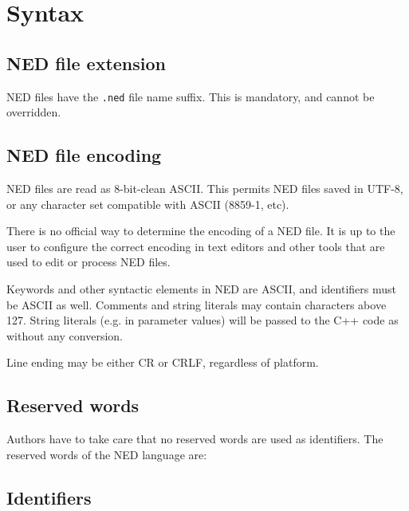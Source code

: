 \label{cha:ned-ref}

\section{Syntax}

\subsection{NED file extension}

NED files have the \texttt{.ned} file name suffix. This is mandatory, and
cannot be overridden.

\subsection{NED file encoding}

NED files are read as 8-bit-clean ASCII. This permits NED files saved
in UTF-8, or any character set compatible with ASCII (8859-1, etc).

\begin{note}
    There is no official way to determine the encoding of a NED file. It is up
    to the user to configure the correct encoding in text editors and other
    tools that are used to edit or process NED files.
\end{note}

Keywords and other syntactic elements in NED are ASCII, and identifiers must be
ASCII as well. Comments and string literals may contain characters above
127. String literals (e.g. in parameter values) will be passed to the C++ code
as  without any conversion.

Line ending may be either CR or CRLF, regardless of platform.


\subsection{Reserved words}

Authors have to take care that no reserved words are used as identifiers.
The reserved words of the NED language are:



\subsection{Identifiers}

